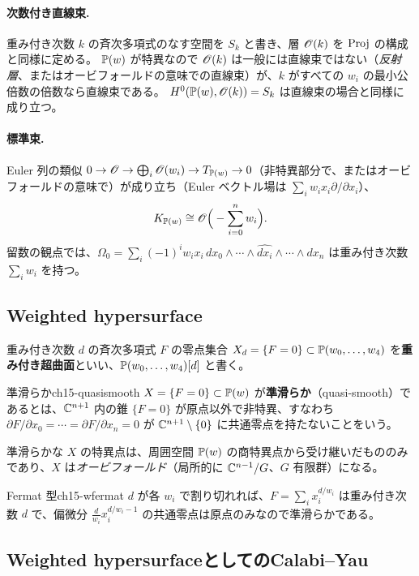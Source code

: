 \paragraph{次数付き直線束.}
重み付き次数 $k$ の斉次多項式のなす空間を $S_k$ と書き、層 $\mathscr{O}(k)$ を $\operatorname{Proj}$ の構成と同様に定める。
$\mathbb{P}(w)$ が特異なので $\mathscr{O}(k)$ は一般には直線束ではない（\emph{反射層}、またはオービフォールドの意味での直線束）が、$k$ がすべての $w_i$ の最小公倍数の倍数なら直線束である。
$H^0(\mathbb{P}(w),\mathscr{O}(k)) = S_k$ は直線束の場合と同様に成り立つ。

\paragraph{標準束.}
Euler 列の類似 $0\to\mathscr{O}\to\bigoplus_i\mathscr{O}(w_i)\to T_{\mathbb{P}(w)}\to0$（非特異部分で、またはオービフォールドの意味で）が成り立ち（Euler ベクトル場は $\sum_iw_ix_i\partial/\partial x_i$）、
\[
K_{\mathbb{P}(w)}\cong\mathscr{O}\Big(-\sum_{i=0}^nw_i\Big).
\]
留数の観点では、$\Omega_0 = \sum_i(-1)^iw_ix_i\,dx_0\wedge\cdots\wedge\widehat{dx_i}\wedge\cdots\wedge dx_n$ は重み付き次数 $\sum_iw_i$ を持つ。

\subsection{Weighted hypersurface}

重み付き次数 $d$ の斉次多項式 $F$ の零点集合 $X_d = \{F = 0\}\subset\mathbb{P}(w_0,\dots,w_4)$ を\textbf{重み付き超曲面}といい、$\mathbb{P}(w_0,\dots,w_4)[d]$ と書く。

\begin{mydef}{準滑らか}{ch15-quasismooth}
$X = \{F=0\}\subset\mathbb{P}(w)$ が\textbf{準滑らか}（quasi-smooth）であるとは、$\mathbb{C}^{n+1}$ 内の錐 $\{F=0\}$ が原点以外で非特異、すなわち
$\partial F/\partial x_0 = \cdots = \partial F/\partial x_n = 0$ が $\mathbb{C}^{n+1}\setminus\{0\}$ に共通零点を持たないことをいう。
\end{mydef}

準滑らかな $X$ の特異点は、周囲空間 $\mathbb{P}(w)$ の商特異点から受け継いだもののみであり、$X$ は\emph{オービフォールド}（局所的に $\mathbb{C}^{n-1}/G$、$G$ 有限群）になる。

\begin{myex}{Fermat 型}{ch15-wfermat}
$d$ が各 $w_i$ で割り切れれば、$F = \sum_ix_i^{d/w_i}$ は重み付き次数 $d$ で、偏微分 $\frac{d}{w_i}x_i^{d/w_i-1}$ の共通零点は原点のみなので準滑らかである。
\end{myex}

\subsection{Weighted hypersurfaceとしてのCalabi--Yau}


